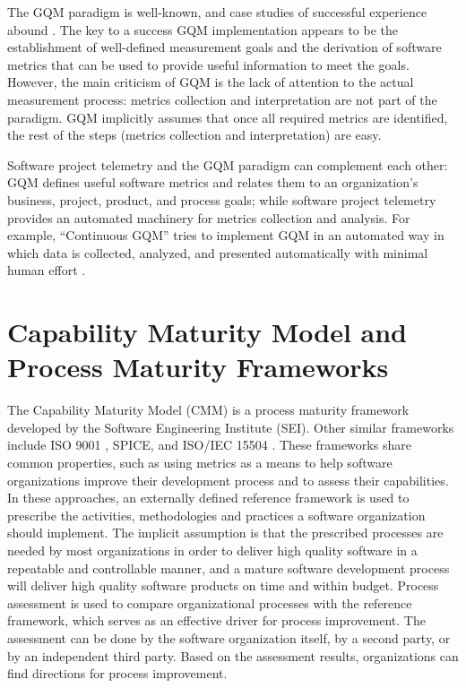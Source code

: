 The GQM paradigm is well-known, and case studies of successful experience abound \cite{Basili:1996, Latum:1998, Fuggetta:1998}. The key to a success GQM implementation appears to be the establishment of well-defined measurement goals and the derivation of software metrics that can be used to provide useful information to meet the goals. However, the main criticism of GQM is the lack of attention to the actual measurement process: metrics collection and interpretation are not part of the paradigm. GQM implicitly assumes that once all required metrics are identified, the rest of the steps (metrics collection and interpretation) are easy.

Software project telemetry and the GQM paradigm can complement each other: GQM defines useful software metrics and relates them to an organization's business, project, product, and process goals; while software project telemetry provides an automated machinery for metrics collection and analysis. For example, ``Continuous GQM'' \cite{Lofi:2005} tries to implement GQM in an automated way in which data is collected, analyzed, and presented automatically with minimal human effort .









\section{Capability Maturity Model and Process Maturity Frameworks}  
\label{RelatedWork:CMM}

The Capability Maturity Model (CMM) \cite{Paulk:1993, SEI:1995} is a process maturity framework developed by the Software Engineering Institute (SEI). Other similar frameworks include ISO 9001 \cite{ISO9001:1987}, SPICE, and ISO/IEC 15504 \cite{ISO:1998, Eman:1998}. These frameworks share common properties, such as using metrics as a means to help software organizations improve their development process and to assess their capabilities. In these approaches, an externally defined reference framework is used to prescribe the activities, methodologies and practices a software organization should implement. The implicit assumption is that the prescribed processes are needed by most organizations in order to deliver high quality software in a repeatable and controllable manner, and a mature software development process will deliver high quality software products on time and within budget. Process assessment is used to compare organizational processes with the reference framework, which serves as an effective driver for process improvement. The assessment can be done by the software organization itself, by a second party, or by an independent third party. Based on the assessment results, organizations can find directions for process improvement.

